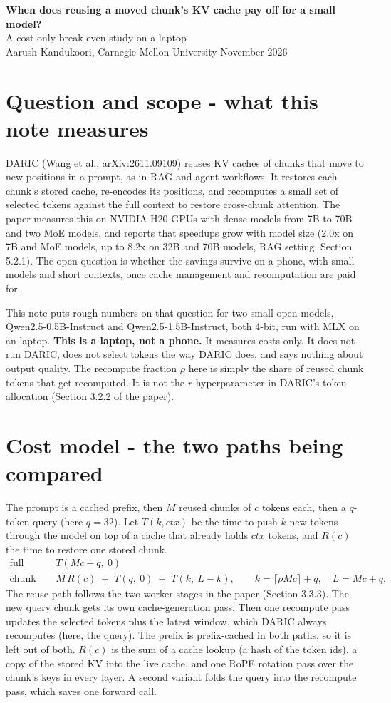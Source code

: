 \documentclass[10pt]{article}
\begin{document}
{\large\bfseries When does reusing a moved chunk's KV cache pay off for a small model?}\\[2pt]
A cost-only break-even study on a laptop\\[2pt]
Aarush Kandukoori, Carnegie Mellon University \hfill November 2026

\section{Question and scope - what this note measures}
DARIC (Wang et al., arXiv:2611.09109) reuses KV caches of chunks that move to new positions in a prompt, as in RAG and
agent workflows. It restores each chunk's stored cache, re-encodes its positions, and recomputes a small set of
selected tokens against the full context to restore cross-chunk attention. The paper measures this on NVIDIA H20 GPUs with
dense models from 7B to 70B and two MoE models, and reports that speedups grow with model size (2.0x on 7B and MoE models, up to 8.2x on 32B and
70B models, RAG setting, Section 5.2.1). The open question is whether the savings survive on a phone, with small models and
short contexts, once cache management and recomputation are paid for.

This note puts rough numbers on that question for two small open models, Qwen2.5-0.5B-Instruct and
Qwen2.5-1.5B-Instruct, both 4-bit, run with MLX \mlxver{} on an \chip{} laptop. \textbf{This is a laptop, not a phone.}
It measures costs only. It does not run DARIC, does not select tokens the way DARIC does, and says nothing about output
quality. The recompute fraction $\rho$ here is simply the share of reused chunk tokens that get recomputed. It is not the
$r$ hyperparameter in DARIC's token allocation (Section 3.2.2 of the paper).

\section{Cost model - the two paths being compared}
The prompt is a cached prefix, then $M$ reused chunks of $c$ tokens each, then a $q$-token query (here $q = 32$).
Let $T(k, \mathit{ctx})$ be the time to push $k$ new tokens through the model on top of a cache that already holds
$\mathit{ctx}$ tokens, and $R(c)$ the time to restore one stored chunk.
\begin{align*}
\text{full prefill:}\quad & T(Mc + q,\ 0)\\
\text{chunk reuse:}\quad & M\,R(c) \;+\; T(q,\ 0) \;+\; T(k,\ L - k), \qquad k = \lceil \rho M c \rceil + q,\quad L = Mc + q.
\end{align*}
The reuse path follows the two worker stages in the paper (Section 3.3.3). The new query chunk gets its own
cache-generation pass. Then one recompute pass updates the selected tokens plus the latest window, which DARIC always
recomputes (here, the query). The prefix is prefix-cached in both paths, so it is left out of both. $R(c)$ is the sum of
a cache lookup (a hash of the token ids), a copy of the stored KV into the live cache, and one RoPE rotation pass over
the chunk's keys in every layer. A second variant folds the query into the recompute pass, which saves one forward call.
\end{document}
